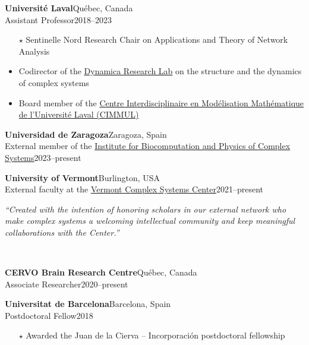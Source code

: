 \documentclass[11pt]{article}
\begin{document}
%
\parbox[t]{\textwidth}{%
\textbf{Universit\'e Laval}\hfill Qu\'ebec, Canada\\
Assistant Professor\hfill 2018--2023
\begin{itemize}[leftmargin=1.5em]\small
  \item[$\star$] Sentinelle Nord Research Chair on Applications and Theory of Network Analysis
  \item Codirector of the \href{http://dynamica.phy.ulaval.ca}{Dynamica Research Lab} on the structure and the dynamics of complex systems
  \item Board member of the \href{http://cimmul.fsg.ulaval.ca}{Centre Interdisciplinaire en Modélisation Mathématique de l’Université Laval (CIMMUL)}
\end{itemize}}
%
\parbox[t]{\textwidth}{%
\textbf{Universidad de Zaragoza}\hfill Zaragoza, Spain\\
External member of the \href{https://bifi.es}{Institute for Biocomputation and Physics of Complex Systems}\hfill 2023--present%
\vspace{0.25\baselineskip}\\}
%
\parbox[t]{\textwidth}{%
\textbf{University of Vermont}\hfill Burlington, USA\\
External faculty at the \href{https://vermontcomplexsystems.org}{Vermont Complex Systems Center}\hfill 2021--present%
\vspace{0.25\baselineskip}\\\hspace*{1.5em}%
\begin{minipage}{0.75\textwidth}
  \small\textit{``Created with the intention of honoring scholars in our external network who make complex systems a welcoming intellectual community and keep meaningful collaborations with the Center.''}
\end{minipage}
\vspace{0.75\baselineskip}\\}
%
\parbox[t]{\textwidth}{%
\textbf{CERVO Brain Research Centre}\hfill Qu\'ebec, Canada\\
Associate Researcher\hfill 2020--present%
\vspace{0.25\baselineskip}\\}
%
\parbox[t]{\textwidth}{%
\textbf{Universitat de Barcelona}\hfill Barcelona, Spain\\
Postdoctoral Fellow\hfill 2018
\begin{itemize}[leftmargin=1.5em]\small
  \item[$\star$] Awarded the Juan de la Cierva -- Incorporaci\'on postdoctoral fellowship
\end{itemize}}
\end{document}
